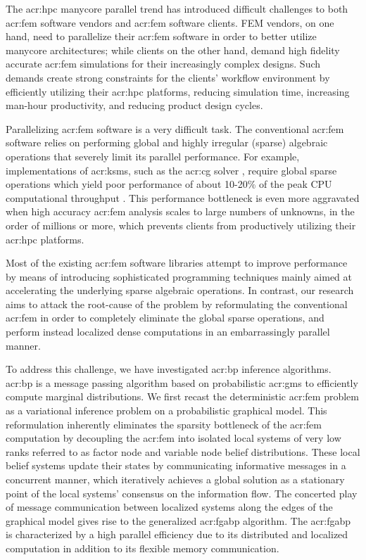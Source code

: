 The \gls{acr:hpc} manycore parallel trend has introduced difficult challenges to both \gls{acr:fem} software vendors and \gls{acr:fem} software clients.
FEM vendors, on one hand, need to parallelize their \gls{acr:fem} software in order to better utilize manycore architectures; while clients on the other hand, demand high fidelity accurate \gls{acr:fem} simulations for their increasingly complex designs.
Such demands create strong constraints for the clients' workflow environment by efficiently utilizing their \gls{acr:hpc} platforms, reducing simulation time, increasing man-hour productivity, and reducing product design cycles.


Parallelizing \gls{acr:fem} software is a very difficult task.
The conventional \gls{acr:fem} software relies on performing global and highly irregular (sparse) algebraic operations that severely limit its parallel performance.
For example, implementations of \glspl{acr:ksm}, such as the \gls{acr:cg} solver \cite{bib:Saad2003IMFSLS2E}, require global sparse operations which yield poor performance of about 10-20\% of the peak CPU computational throughput \cite{bib:Demmel2007OODMVMOEMP}.
This performance bottleneck is even more aggravated when high accuracy \gls{acr:fem} analysis scales to large numbers of unknowns, in the order of millions or more, which prevents clients from productively utilizing their \gls{acr:hpc} platforms.


Most of the existing \gls{acr:fem} software libraries attempt to improve performance by means of introducing sophisticated programming techniques mainly aimed at accelerating the underlying sparse algebraic operations.
In contrast, our research aims to attack the root-cause of the problem by reformulating the conventional \gls{acr:fem} in order to completely eliminate the global sparse operations, and perform instead localized dense computations in an embarrassingly parallel manner.


To address this challenge, we have investigated \gls{acr:bp} inference algorithms.
\gls{acr:bp} is a message passing algorithm based on probabilistic \glspl{acr:gm} to efficiently compute marginal distributions.
We first recast the deterministic \gls{acr:fem} problem as a variational inference problem on a probabilistic graphical model.
This reformulation inherently eliminates the sparsity bottleneck of the \gls{acr:fem} computation by decoupling the \gls{acr:fem} into isolated local systems of very low ranks referred to as factor node and variable node belief distributions.
These local belief systems update their states by communicating informative messages in a concurrent manner, which iteratively achieves a global solution as a stationary point of the local systems' consensus on the information flow.
The concerted play of message communication between localized systems along the edges of the graphical model gives rise to the generalized \gls{acr:fgabp} algorithm.
The \gls{acr:fgabp} is characterized by a high parallel efficiency due to its distributed and localized computation in addition to its flexible memory communication.



